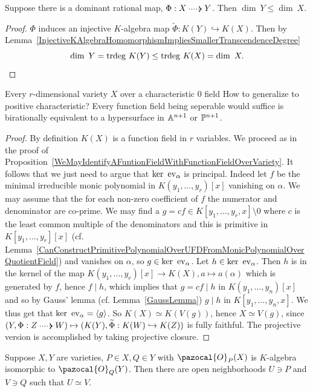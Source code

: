     \begin{proposition}
        Suppose there is a dominant rational map, $\Phi: X\dottedarrow Y$. Then $\dim\ Y \leq \dim \ X$.
    \end{proposition}
    \begin{proof}
        $\Phi$ induces an injective $K$-algebra map $\widetilde{\Phi}: K(Y)\hookrightarrow K(X)$. Then by Lemma~\ref{InjectiveKAlgebraHomomorphismImpliesSmallerTranscendenceDegree} 
        $$\dim \ Y = \mathrm{trdeg }\ K(Y)\leq \mathrm{trdeg }\ K(X) = \dim \ X.$$
    \end{proof}
    \begin{proposition}
        Every $r$-dimensional variety $X$ over a characteristic $0$ field {\Large How to generalize to positive characteristic? Every function field being seperable would suffice} is birationally equivalent to a hypersurface in $\mathbb{A}^{n+1}$ or $\mathbb{P}^{n+1}$.
    \end{proposition}
    \begin{proof}
        By definition $K(X)$ is a function field in $r$ variables. We proceed as in the proof of Proposition~\ref{WeMayIdentifyAFuntionFieldWithFunctionFieldOverVariety}. It follows that we just need to argue that $\ker \ \mathrm{ev}_\alpha$ is principal. Indeed let $f$ be the minimal irreducible monic polynomial in $K(y_1,\dots,y_r)[x]$ vanishing on $\alpha$. We may assume that the for each non-zero coefficient of $f$ the numerator and denominator are co-prime. We may find a $g=cf\in K[y_1,\dots,y_r,x]\setminus 0$ where $c$ is the least common multiple of the denominators and this is primitive in $K[y_1,\dots,y_r][x]$ (cf. Lemma~\ref{CanConstructPrimitivePolynomialOverUFDFromMonicPolynomialOverQuotientField}) and vanishes on $\alpha$, so $g\in \ker\ \mathrm{ev}_\alpha$. Let $h\in \ker\ \mathrm{ev}_\alpha$. Then $h$ is in the kernel of the map $K(y_1,\dots,y_r)[x]\rightarrow K(X), a\mapsto a(\alpha)$ which is generated by $f$, hence $f\mid h$, which implies that $g=cf \mid h$ in $K(y_1,\dots,y_n)[x]$ and so by Gauss' lemma (cf. Lemma~\ref{GaussLemma}) $g\mid h$ in  $K[y_1,\dots,y_n,x].$ We thus get that $\ker\ \mathrm{ev}_\alpha = \langle g\rangle$. So $K(X)\simeq K(V(g))$, hence $X\simeq V(g)$, since $(Y,\Phi : Z\dottedarrow W)\mapsto (K(Y), \widetilde{\Phi} : K(W) \hookrightarrow K(Z))$ is fully faithful. The projective version is accomplished by taking projective closure. 
    \end{proof}
    \begin{proposition}\label{ThereIsAlwaysABirationalMapToAPlaneCurveWhoseInverseHasTheImageOfAFixedPointInDomain}
        Suppose $X,Y$ are varieties, $P\in X, Q\in Y$ with $\pazocal{O}_P(X)$ is $K$-algebra isomorphic to $\pazocal{O}_Q(Y)$. Then there are open neighborhoods $U\ni P$ and $V\ni Q$ such that $U\simeq V$.
    \end{proposition}
